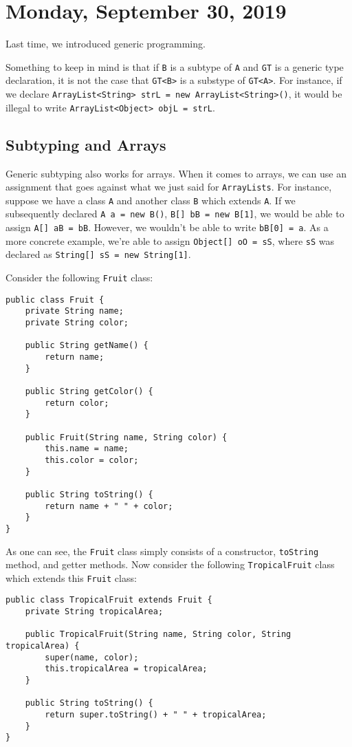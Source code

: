 \section{Monday, September 30, 2019}

Last time, we introduced generic programming. 


Something to keep in mind is that if \verb!B! is a subtype of \verb!A! and \verb!GT! is a generic type declaration, it is not the case that \verb!GT<B>! is a substype of \verb!GT<A>!. For instance, if we declare \verb!ArrayList<String> strL = new ArrayList<String>()!, it would be illegal to write \verb!ArrayList<Object> objL = strL!.


\subsection{Subtyping and Arrays}

Generic subtyping also works for arrays. When it comes to arrays, we can use an assignment that goes against what we just said for \verb!ArrayLists!. For instance, suppose we have a class \verb!A! and another class \verb!B! which extends \verb!A!. If we subsequently declared \verb!A a = new B()!, \verb!B[] bB = new B[1]!, we would be able to assign \verb!A[] aB = bB!. However, we wouldn't be able to write \verb!bB[0] = a!. As a more concrete example, we're able to assign \verb!Object[] oO = sS!, where \verb!sS! was declared as \verb!String[] sS = new String[1]!.


Consider the following \verb!Fruit! class:

\begin{lstlisting}
public class Fruit {
	private String name;
	private String color;

	public String getName() {
		return name;
	}

	public String getColor() {
		return color;
	}

	public Fruit(String name, String color) {
		this.name = name;
		this.color = color;
	}

	public String toString() {
		return name + " " + color;
	}
}
\end{lstlisting}

As one can see, the \verb!Fruit! class simply consists of a constructor, \verb!toString! method, and getter methods. Now consider the following \verb!TropicalFruit! class which extends this \verb!Fruit! class:

\begin{lstlisting}
public class TropicalFruit extends Fruit {
	private String tropicalArea;

	public TropicalFruit(String name, String color, String tropicalArea) {
		super(name, color);
		this.tropicalArea = tropicalArea;
	}

	public String toString() {
		return super.toString() + " " + tropicalArea;
	}
}
\end{lstlisting}

